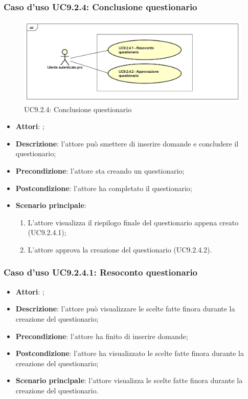 		\subsubsection{Caso d'uso UC9.2.4: Conclusione questionario}
		\label{UC9.2.4}
		\begin{figure}[h]
			\centering
			\includegraphics[scale=0.5,keepaspectratio]{UML/UC9_2_4.png}
			\caption{UC9.2.4: Conclusione questionario}
		\end{figure}
		\FloatBarrier
		\begin{itemize}
			\item \textbf{Attori}: \uaupro{}; 
			\item \textbf{Descrizione}: l'attore può smettere di inserire domande e concludere il questionario;
			\item \textbf{Precondizione}: l'attore sta creando un questionario;
			\item \textbf{Postcondizione}: l'attore ha completato il questionario;
			\item \textbf{Scenario principale}: 
				\begin{enumerate}
					\item L'attore visualizza il riepilogo finale del questionario appena creato (UC9.2.4.1); 
					\item L'attore approva la creazione del questionario (UC9.2.4.2).
				\end{enumerate}
		\end{itemize}
				
			\subsubsection{Caso d'uso UC9.2.4.1: Resoconto questionario}
			\label{UC9.2.4.1}
			\begin{itemize}
				\item \textbf{Attori}: \uaupro{};
				\item \textbf{Descrizione}: l'attore può visualizzare le scelte fatte finora durante la creazione del questionario;
				\item \textbf{Precondizione}: l'attore ha finito di inserire domande;
				\item \textbf{Postcondizione}: l'attore ha visualizzato le scelte fatte finora durante la creazione del questionario;
				\item \textbf{Scenario principale}: l'attore visualizza le scelte fatte finora durante la creazione del questionario.
			\end{itemize}
			
